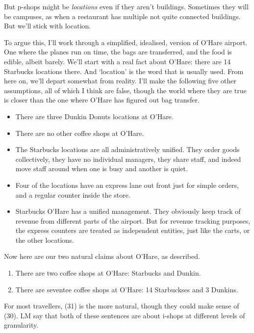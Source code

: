\documentclass[
  11pt,
  letterpaper,
  DIV=11,
  numbers=noendperiod,
  twoside]{scrartcl}
\providecommand{\tightlist}{%
  \setlength{\itemsep}{0pt}\setlength{\parskip}{0pt}}
\begin{document}
But p-shops might be \emph{locations} even if they aren't buildings.
Sometimes they will be campuses, as when a restaurant has multiple not
quite connected buildings. But we'll stick with location.

To argue this, I'll work through a simplified, idealised, version of
O'Hare airport. One where the planes run on time, the bags are
transferred, and the food is edible, albeit barely. We'll start with a
real fact about O'Hare: there are 14 Starbucks locations there. And
`location' is the word that is usually used. From here on, we'll depart
somewhat from reality. I'll make the following five other assumptions,
all of which I think are false, though the world where they are true is
closer than the one where O'Hare has figured out bag transfer.

\begin{itemize}
\tightlist
\item
  There are three Dunkin Donuts locations at O'Hare.
\item
  There are no other coffee shops at O'Hare.
\item
  The Starbucks locations are all administratively unified. They order
  goods collectively, they have no individual managers, they share
  staff, and indeed move staff around when one is busy and another is
  quiet.
\item
  Four of the locations have an express lane out front just for simple
  orders, and a regular counter inside the store.
\item
  Starbucks O'Hare has a unified management. They obviously keep track
  of revenue from different parts of the airport. But for revenue
  tracking purposes, the express counters are treated as independent
  entities, just like the carts, or the other locations.
\end{itemize}

Now here are our two natural claims about O'Hare, as described.

\begin{enumerate}
\def\labelenumi{(\arabic{enumi})}
\setcounter{enumi}{29}
\tightlist
\item
  There are two coffee shops at O'Hare: Starbucks and Dunkin.
\item
  There are seventee coffee shops at O'Hare: 14 Starbuckses and 3
  Dunkins.
\end{enumerate}

For most travellers, (31) is the more natural, though they could make
sense of (30). LM say that both of these sentences are about i-shops at
different levels of granularity.
\end{document}
